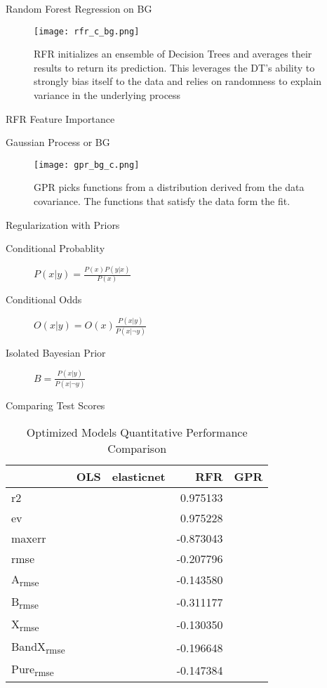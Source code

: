 \documentclass[10pt, compress]{beamer}
\begin{document}
\begin{frame}[allowframebreaks]{Random Forest Regression on BG}
\begin{figure}[htbp]
\centering
\texttt{[image: rfr\_c\_bg.png]}
\caption{RFR initializes an ensemble of Decision Trees and averages their results to return its prediction. This leverages the DT's ability to strongly bias itself to the data and relies on randomness to explain variance in the underlying process}
\end{figure}
\end{frame}
\begin{frame}[label={sec:org43565ef}]{RFR Feature Importance}
\end{frame}
\begin{frame}[allowframebreaks]{Gaussian Process or BG}
\begin{figure}[htbp]
\centering
\texttt{[image: gpr\_bg\_c.png]}
\caption{GPR picks functions from a distribution derived from the data covariance. The functions that satisfy the data form the fit.}
\end{figure}
\begin{block}{Regularization with Priors}
\begin{description}
\item[{Conditional Probablity}] \(P(x|y) = \frac{P(x)P(y|x)}{P(x)}\)
\item[{Conditional Odds}] \(O(x|y) = O(x)\frac{P(x|y)}{P(x|\neg{}y)}\)
\item[{Isolated Bayesian Prior}] \(B = \frac{P(x|y)}{P(x|\neg{}y)}\)
\end{description}
\end{block}
\end{frame}

\begin{frame}[label={sec:orgfd89f71}]{Comparing Test Scores}
\begin{table}[htbp]
\caption{Optimized Models Quantitative Performance Comparison}
\centering
\begin{tabular}{lllrl}
 & OLS & elasticnet & RFR & GPR\\
\hline
r2 &  &  & 0.975133 & \\
ev &  &  & 0.975228 & \\
maxerr &  &  & -0.873043 & \\
rmse &  &  & -0.207796 & \\
A\textsubscript{rmse} &  &  & -0.143580 & \\
B\textsubscript{rmse} &  &  & -0.311177 & \\
X\textsubscript{rmse} &  &  & -0.130350 & \\
BandX\textsubscript{rmse} &  &  & -0.196648 & \\
Pure\textsubscript{rmse} &  &  & -0.147384 & \\
\end{tabular}
\end{table}
\end{frame}
\section{}
\label{sec:org0c25222}
\printbibliography
\end{document}
